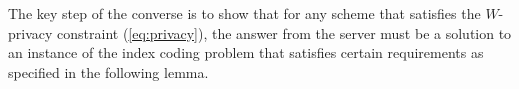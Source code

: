 \documentclass[letterpaper, 10 pt, conference]{ieeeconf}
\newtheorem{lemma}{Lemma}
\begin{document}
The key step of the converse is to show that for any  scheme that satisfies the $W$-privacy constraint (\ref{eq:privacy}), the answer from the server must be a solution to an instance of the index coding problem that satisfies certain requirements as specified in the following lemma.







\end{document}

